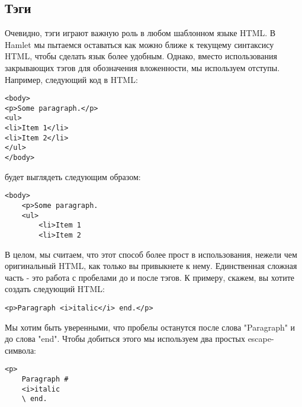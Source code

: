 \subsection{Тэги}
Очевидно, тэги играют важную роль в любом шаблонном языке HTML. В Hamlet
мы пытаемся оставаться как можно ближе к текущему синтаксису HTML, чтобы
сделать язык более удобным. Однако, вместо использования закрывающих тэгов
для обозначения вложенности, мы используем отступы. Например, следующий код
в HTML:

\begin{lstlisting}
<body>                                                                          
<p>Some paragraph.</p>                                                          
<ul>                                                                            
<li>Item 1</li>                                                                 
<li>Item 2</li>                                                                 
</ul>                                                                           
</body>   
\end{lstlisting}

будет выглядеть следующим образом:
\begin{lstlisting}
<body>                                                                          
    <p>Some paragraph.                                                          
    <ul>                                                                        
        <li>Item 1                                                              
        <li>Item 2    
\end{lstlisting}

В целом, мы считаем, что этот способ более прост в использования, нежели чем 
оригинальный HTML, как только вы привыкнете к нему. Единственная сложная часть
 - это работа с пробелами до и после тэгов. К примеру, скажем, вы хотите
создать следующий HTML:

\begin{lstlisting}
<p>Paragraph <i>italic</i> end.</p>
\end{lstlisting}

Мы хотим быть уверенными, что пробелы останутся после слова "Paragraph" и
до слова "end". Чтобы добиться этого мы используем два простых escape-символа:

\begin{lstlisting}
<p>                                                                             
    Paragraph #                                                                 
    <i>italic                                                                   
    \ end.         
\end{lstlisting}

